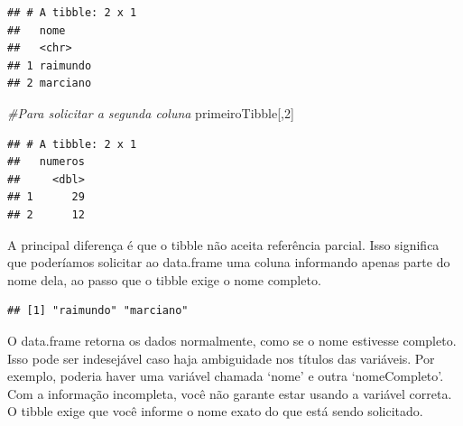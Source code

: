 \documentclass[
]{book}
\newenvironment{Shaded}{\begin{snugshade}}{\end{snugshade}}
\newcommand{\CommentTok}[1]{\textcolor[rgb]{0.56,0.35,0.01}{\textit{#1}}}
\newcommand{\DecValTok}[1]{\textcolor[rgb]{0.00,0.00,0.81}{#1}}
\newcommand{\NormalTok}[1]{#1}
\newcommand{\SpecialCharTok}[1]{\textcolor[rgb]{0.00,0.00,0.00}{#1}}
\begin{document}
\begin{verbatim}
## # A tibble: 2 x 1
##   nome    
##   <chr>   
## 1 raimundo
## 2 marciano
\end{verbatim}

\begin{Shaded}
\begin{Highlighting}[]
\CommentTok{\#Para solicitar a segunda coluna}
\NormalTok{primeiroTibble[,}\DecValTok{2}\NormalTok{]}
\end{Highlighting}
\end{Shaded}

\begin{verbatim}
## # A tibble: 2 x 1
##   numeros
##     <dbl>
## 1      29
## 2      12
\end{verbatim}

A principal diferença é que o tibble não aceita referência parcial. Isso significa que poderíamos solicitar ao data.frame uma coluna informando apenas parte do nome dela, ao passo que o tibble exige o nome completo.

\begin{Shaded}
\end{Shaded}

\begin{verbatim}
## [1] "raimundo" "marciano"
\end{verbatim}

O data.frame retorna os dados normalmente, como se o nome estivesse completo. Isso pode ser indesejável caso haja ambiguidade nos títulos das variáveis. Por exemplo, poderia haver uma variável chamada `nome' e outra `nomeCompleto'. Com a informação incompleta, você não garante estar usando a variável correta. O tibble exige que você informe o nome exato do que está sendo solicitado.

\begin{Shaded}
\end{Shaded}
\end{document}
